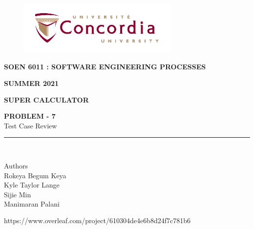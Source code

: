 \documentclass[letterpaper, 11pt]{report}
\begin{document}
\begin{titlepage}
\vspace*{0.7in}
\begin{center}
\begin{figure}[htb]
\begin{center}
\includegraphics[width=8cm]{univ_logo}
\end{center}
\end{figure}
\vspace*{0.3in}
\begin{Large}
\textbf{SOEN 6011 : SOFTWARE ENGINEERING PROCESSES} \\
\end{Large}
\vspace*{0.1in}
\begin{Large}
\textbf{SUMMER 2021} \\
\end{Large}
\vspace*{0.9in}
\begin{Large}
\textbf{SUPER CALCULATOR} \\
\end{Large}
\vspace*{0.9in}
\begin{Large} 


\textbf{PROBLEM - 7} \\
 Test Case Review\\
\end{Large}
\vspace*{0.625in}
\rule{80mm}{0.1mm}\\
\vspace*{0.1in}
\begin{large}
Authors \\
\vspace*{0.1in}
Rokeya Begum Keya\\
\vspace*{0.1in}
Kyle Taylor Lange\\
\vspace*{0.1in}
Sijie Min\\
\vspace*{0.1in}
Manimaran Palani\\ 
\vspace*{0.3in}
\date{\normalsize\today} 
\end{large}
\end{center}
\begin{center}
https://www.overleaf.com/project/610304de4e6b8d24f7c781b6\end{center}
\end{titlepage}
\tableofcontents
\newpage
\end{document}
